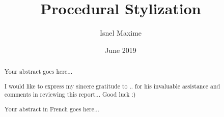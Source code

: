 \documentclass[12pt, a4paper]{memoir} %
\title{Procedural Stylization} %
\author{Isnel Maxime}
\date{June 2019} %
\begin{document}
\frontmatter
\begin{titlingpage}
\maketitle
\end{titlingpage}

\setlength{\parskip}{-1pt plus 1pt}

\renewcommand{\abstracttextfont}{\normalfont}
\abstractintoc
\begin{abstract}
Your abstract goes here...
\end{abstract}
\abstractintoc

\renewcommand\abstractname{Acknowledgement}
\begin{abstract}


I would like to express my sincere gratitude to .. for his invaluable assistance and comments in reviewing this report...
Good luck :)
\end{abstract}


\renewcommand\abstractname{R\'esum\'e}
\begin{abstract} 
Your abstract in French goes here...
\end{abstract}

\cleardoublepage

\tableofcontents* %
\normalsize

\mainmatter
\SingleSpace




%
%


\backmatter



\end{document}
